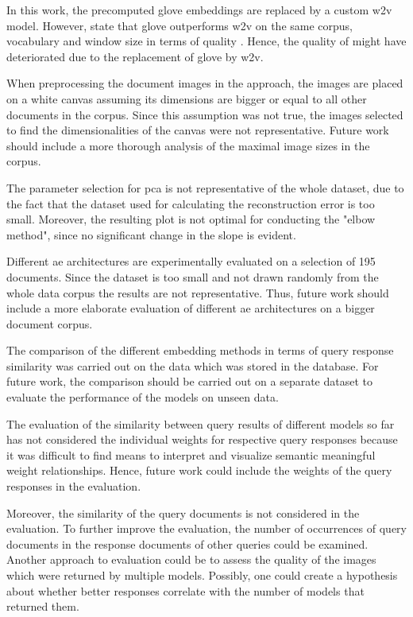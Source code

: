 In this work, the precomputed \ac{glove} embeddings are replaced by a custom \ac{w2v} model.
However, \citeauthor{glove2014} state that \acs{glove} outperforms \ac{w2v} on the same corpus, 
vocabulary and window size in terms of quality \cite{glove2014}.
Hence, the quality of \infersent{} might have deteriorated due to the replacement of \ac{glove} by \ac{w2v}.

When preprocessing the document images in the \eigendocs{} approach, the images are placed on a white canvas assuming 
its dimensions are bigger or equal to all other documents in the corpus.
Since this assumption was not true, the images selected to find the dimensionalities of the canvas were not representative.
Future work should include a more thorough analysis of the maximal image sizes in the corpus.

The parameter selection for \ac{pca} is not representative of the whole dataset, 
due to the fact that the dataset used for calculating the reconstruction error is too small.
Moreover, the resulting plot is not optimal for conducting the "elbow method", since no significant change in the slope is evident.


Different \ac{ae} architectures are experimentally evaluated on a selection of 195 documents.
Since the dataset is too small and not drawn randomly from the whole data corpus the results are not representative.
Thus, future work should include a more elaborate evaluation of different \ac{ae} architectures on a bigger document corpus.

The comparison of the different embedding methods in terms of query response similarity was carried out on the data which was stored in the database.
For future work, the comparison should be carried out on a separate dataset to evaluate the performance of the models on unseen data.

The evaluation of the similarity between query results of different models so far 
has not considered the individual weights for respective query responses
because it was difficult to find means 
to interpret and visualize semantic meaningful weight relationships.
Hence, future work could include the weights of the query responses in the evaluation.

Moreover, the similarity of the query documents is not considered in the evaluation.
To further improve the evaluation, the number of occurrences of query documents in the response documents of other queries could be examined.
Another approach to evaluation could be to assess the quality of the images which were returned by multiple models.
Possibly, one could create a hypothesis about whether better responses correlate with the number of models that returned them.

